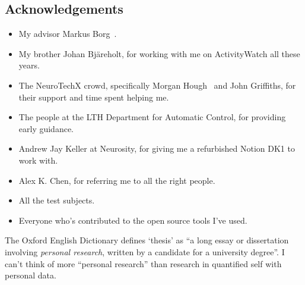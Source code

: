 \documentclass[a4paper]{article}
\begin{document}
\begin{refsection}
\section*{Acknowledgements}

\begin{itemize}
 \item My advisor Markus Borg~.
 \item My brother Johan Bjäreholt, for working with me on ActivityWatch all these years.
 \item The NeuroTechX crowd, specifically Morgan Hough~ and John Griffiths, for their support and time spent helping me.
 \item The people at the LTH Department for Automatic Control, for providing early guidance.
 \item Andrew Jay Keller at Neurosity, for giving me a refurbished Notion DK1 to work with.
 \item Alex K. Chen, for referring me to all the right people.
 \item All the test subjects.
 \item Everyone who's contributed to the open source tools I've used.
\end{itemize}

    The Oxford English Dictionary defines `thesis' as ``a long essay or dissertation involving \emph{personal research}, written by a candidate for a university degree''. I can't think of more ``personal research'' than research in quantified self with personal data.


\printbibliography[category=cited]

\nocite{*}
  {\list{}
     {\setlength{\leftmargin}{\bibhang}%
      \setlength{\itemindent}{-\leftmargin}%
      \setlength{\itemsep}{\bibitemsep}%
      \setlength{\parsep}{\bibparsep}}
  }
  {\endlist}
  {\item}
\printbibliography[notcategory=cited, env=bibnonum, heading=notcited]

\end{refsection}
\end{document}
